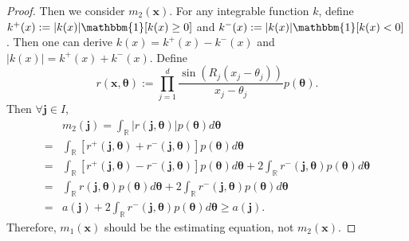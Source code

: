 \documentclass[%
 reprint,
 amsmath,amssymb,
 aps,
]{revtex4-2}
\def\R{\mathbb{R}}
\def\btheta{\boldsymbol{\theta}}
\def\btheta{\boldsymbol{\theta}}
\def\xbold{\mathbf{x}}
\newcommand{\btheta}{\mbox{\boldmath $\theta$}}
\begin{document}
\begin{proof}
    Then we consider $m_2(\xbold)$. For any integrable function $k$, define $k^+(x) := |k(x)|\mathbbm{1}[k(x) \ge 0]$ and $k^-(x) := |k(x)|\mathbbm{1}[k(x) < 0]$. Then one can derive $k(x) = k^+(x) - k^-(x)$ and $|k(x)| = k^+(x) + k^-(x)$. Define 
    \begin{equation*}
        r(\xbold, \btheta) := \prod_{j = 1}^d \frac{\sin(R_j(x_j - \theta_j))}{x_j - \theta_j} p(\btheta).
    \end{equation*}
    Then $\forall \mathbf{j} \in I$,
    \begin{align*}
        & m_2(\mathbf{j}) = \int_\R |r(\mathbf{j}, \btheta)|p(\btheta)d\btheta \\
        = & \int_\R [r^+(\mathbf{j}, \btheta) + r^-(\mathbf{j}, \btheta)]p(\btheta)d\btheta \\
        = & \int_\R [r^+(\mathbf{j}, \btheta) - r^-(\mathbf{j}, \btheta)]p(\btheta)d\btheta + 2\int_\R r^-(\mathbf{j}, \btheta)p(\btheta)d\btheta \\
        = & \int_\R r(\mathbf{j}, \btheta)p(\btheta)d\btheta + 2\int_\R r^-(\mathbf{j}, \btheta)p(\btheta)d\btheta \\
        = & a(\mathbf{j}) + 2\int_\R r^-(\mathbf{j}, \btheta)p(\btheta)d\btheta \ge a(\mathbf{j}).
    \end{align*}
Therefore, $m_1(\xbold)$ should be the estimating equation, not $m_2(\xbold)$.
\end{proof}
\end{document}
